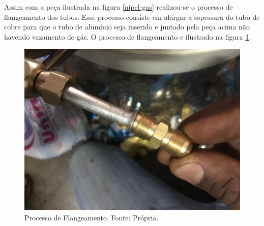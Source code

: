                 Assim com a peça ilustrada na figura \ref{nipel-gas} realizou-se o processo de flangeamento dos
                tubos. Esse processo consiste em alargar a espessura do tubo de cobre para que o
                tubo de alumínio seja inserido e juntado pela peça acima não havendo vazamento de
                gás. O processo de flangeamento e ilustrado na figura \ref{processo-flageamento}.

                \begin{figure}[!htb]
                    \centering
                    \includegraphics[scale= 0.2]{figuras/processo-flagelamento.png}
                    \caption{Processo de Flangeamento. Fonte: Própria.}
                    \label{processo-flageamento}
                \end{figure}
                
